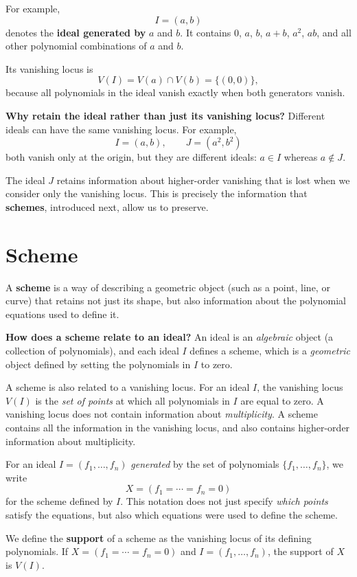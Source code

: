 \documentclass[12pt]{article}
\begin{document}
For example,
\[
I=(a,b)
\]
denotes the \textbf{ideal generated by} $a$ and $b$.
It contains 0, $a$, $b$, $a+b$, $a^2$, $ab$, and all other
polynomial combinations of $a$ and $b$.

Its vanishing locus is
\[
V(I)=V(a)\cap V(b)=\{(0,0)\},
\]
because all polynomials in the ideal vanish exactly when
both generators vanish.

\textbf{Why retain the ideal rather than just its vanishing locus?}
Different ideals can have the same vanishing locus. For example,
\[
I=(a,b),\qquad J=(a^2,b^2)
\]
both vanish only at the origin, but they are different ideals:
$a\in I$ whereas $a\notin J$.

The ideal $J$ retains information about higher-order vanishing
that is lost when we consider only the vanishing locus.
This is precisely the information that \textbf{schemes},
introduced next, allow us to preserve.

\newpage
\section{Scheme}\label{scheme}

A \textbf{scheme} is a way of describing a geometric object
(such as a point, line, or curve) that retains not just its
shape, but also information about the polynomial equations
used to define it.

\textbf{How does a scheme relate to an ideal?}
An ideal is an \emph{algebraic} object (a collection of polynomials), and each ideal $I$ defines a scheme, which is a \emph{geometric} object defined by setting the polynomials in $I$ to zero.

A scheme is also related to a vanishing locus. For an ideal $I$, the vanishing locus $V(I)$ is the \emph{set of points} at which all polynomials in $I$ are equal to zero. A vanishing locus does not contain information about \emph{multiplicity}. A scheme contains all the information in the vanishing locus, and also contains higher-order information about multiplicity.

For an ideal $I=(f_1,\ldots,f_n)$ \emph{generated} by the set of polynomials $\{f_1, \dots, f_n\}$, we write
\[
X=(f_1=\cdots=f_n=0)
\]
for the scheme defined by $I$. This notation does
not just specify \emph{which points} satisfy the equations, but also which
equations were used to define the scheme.

We define the \textbf{support} of a scheme as the vanishing locus of its defining polynomials. If $X=(f_1=\cdots=f_n=0)$ and $I=(f_1,\ldots,f_n)$, the support of $X$ is $V(I)$.
\end{document}
